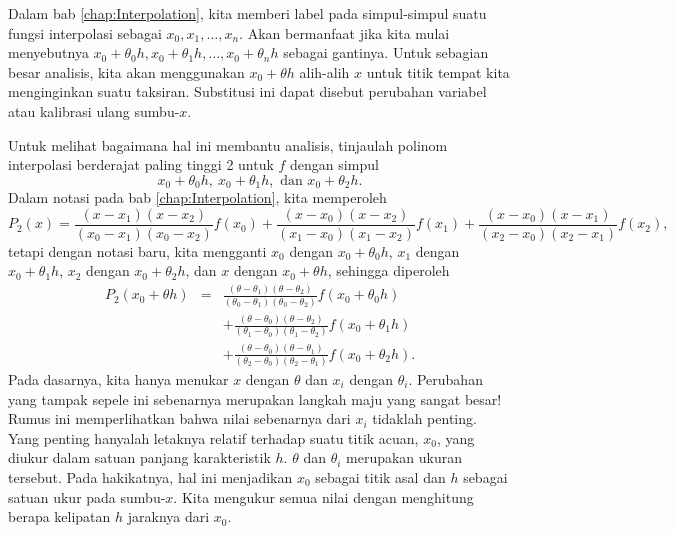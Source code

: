 Dalam bab \ref{chap:Interpolation}, kita memberi label pada simpul-simpul
suatu fungsi interpolasi sebagai $x_{0},x_{1},\ldots,x_{n}$. Akan
bermanfaat jika kita mulai menyebutnya $x_{0}+\theta_{0}h,x_{0}+\theta_{1}h,\ldots,x_{0}+\theta_{n}h$
sebagai gantinya. Untuk sebagian besar analisis, kita akan menggunakan
$x_{0}+\theta h$ alih-alih $x$ untuk titik tempat kita menginginkan
suatu taksiran. Substitusi ini dapat disebut perubahan variabel atau
kalibrasi ulang sumbu-$x$.

Untuk melihat bagaimana hal ini membantu analisis, tinjaulah polinom
interpolasi berderajat paling tinggi 2 untuk $f$ dengan simpul 
\[
x_{0}+\theta_{0}h,\ x_{0}+\theta_{1}h,\mbox{ dan }x_{0}+\theta_{2}h.
\]
Dalam notasi pada bab \ref{chap:Interpolation}, kita memperoleh 
\[
P_{2}(x)=\frac{(x-x_{1})(x-x_{2})}{(x_{0}-x_{1})(x_{0}-x_{2})}f(x_{0})+\frac{(x-x_{0})(x-x_{2})}{(x_{1}-x_{0})(x_{1}-x_{2})}f(x_{1})+\frac{(x-x_{0})(x-x_{1})}{(x_{2}-x_{0})(x_{2}-x_{1})}f(x_{2}),
\]
 tetapi dengan notasi baru, kita mengganti $x_{0}$ dengan $x_{0}+\theta_{0}h$,
$x_{1}$ dengan $x_{0}+\theta_{1}h$, $x_{2}$ dengan $x_{0}+\theta_{2}h$,
dan $x$ dengan $x_{0}+\theta h$, sehingga diperoleh
\begin{eqnarray}
P_{2}(x_{0}+\theta h) & = & \frac{(\theta-\theta_{1})(\theta-\theta_{2})}{(\theta_{0}-\theta_{1})(\theta_{0}-\theta_{2})}f(x_{0}+\theta_{0}h)\nonumber \\
 &  & +\frac{(\theta-\theta_{0})(\theta-\theta_{2})}{(\theta_{1}-\theta_{0})(\theta_{1}-\theta_{2})}f(x_{0}+\theta_{1}h)\nonumber \\
 &  & +\frac{(\theta-\theta_{0})(\theta-\theta_{1})}{(\theta_{2}-\theta_{0})(\theta_{2}-\theta_{1})}f(x_{0}+\theta_{2}h).\label{eq:p2relative}
\end{eqnarray}
Pada dasarnya, kita hanya menukar $x$ dengan $\theta$ dan $x_{i}$
dengan $\theta_{i}$. Perubahan yang tampak sepele ini sebenarnya
merupakan langkah maju yang sangat besar! Rumus ini memperlihatkan
bahwa nilai sebenarnya dari $x_{i}$ tidaklah penting. Yang penting
hanyalah letaknya relatif terhadap suatu titik acuan, $x_{0}$, yang
diukur dalam satuan panjang karakteristik $h$. $\theta$ dan $\theta_{i}$
merupakan ukuran tersebut. Pada hakikatnya, hal ini menjadikan $x_{0}$
sebagai titik asal dan $h$ sebagai satuan ukur pada sumbu-$x$. Kita
mengukur semua nilai dengan menghitung berapa kelipatan $h$ jaraknya
dari $x_{0}$.

